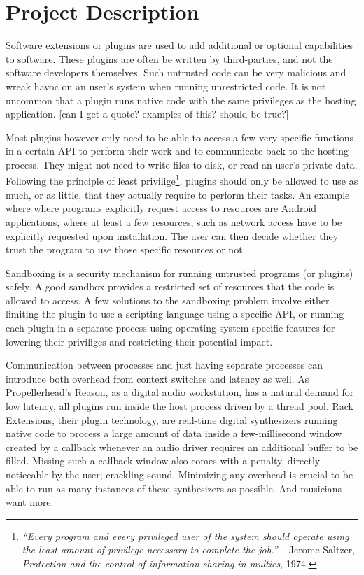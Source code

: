 \chapter* {Project Description}

Software extensions or plugins are used to add additional or optional
capabilities to software.
These plugins are often be written by third-parties, and not the software
developers themselves.
Such untrusted code can be very malicious and wreak havoc on an user's system
when running unrestricted code.
It is not uncommon that a plugin runs native code with the same privileges as
the hosting application. [can I get a quote? examples of this? should be true?]

Most plugins however only need to be able to access a few very specific
functions in a certain API to perform their work and to communicate back to the
hosting process.
They might not need to write files to disk, or read an user's private data.
Following the principle of least privilige\footnote{\emph{``Every program and
every privileged user of the system should operate using the least amount of
privilege necessary to complete the job.''} -- Jerome Saltzer, \emph{Protection
and the control of information sharing in multics}, 1974.}, plugins should only
be allowed to use as much, or as little, that they actually require to perform
their tasks.
An example where where programs explicitly request access to resources are
Android applications, where at least a few resources, such as network access
have to be explicitly requested upon installation. The user can then decide
whether they trust the program to use those specific resources or not.

Sandboxing is a security mechanism for running untrusted programs (or plugins)
safely.
A good sandbox provides a restricted set of resources that the code is allowed
to access.
A few solutions to the sandboxing problem involve either limiting the plugin to
use a scripting language using a specific API, or running each plugin in a
separate process using operating-system specific features for lowering their
priviliges and restricting their potential impact.

Communication between processes and just having separate processes can introduce
both overhead from context switches and latency as well.
As Propellerhead's Reason, as a digital audio workstation, has a natural demand
for low latency, all plugins run inside the host process driven by a thread
pool.
Rack Extensions, their plugin technology, are real-time digital synthesizers
running native code to process a large amount of data inside a few-millisecond
window created by a callback whenever an audio driver requires an additional
buffer to be filled.
Missing such a callback window also comes with a penalty, directly noticeable by
the user; crackling sound.
Minimizing any overhead is crucial to be able to run as many instances of these
synthesizers as possible.
And musicians want more.

